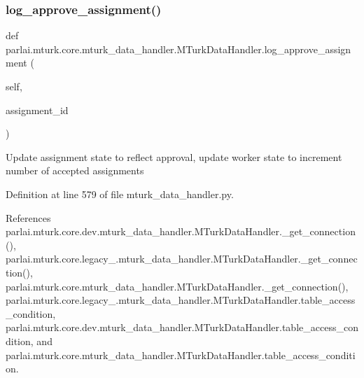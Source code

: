 \subsubsection{\texorpdfstring{log\+\_\+approve\+\_\+assignment()}{log\_approve\_assignment()}}
{\footnotesize\ttfamily def parlai.\+mturk.\+core.\+mturk\+\_\+data\+\_\+handler.\+M\+Turk\+Data\+Handler.\+log\+\_\+approve\+\_\+assignment (\begin{DoxyParamCaption}\item[{}]{self,  }\item[{}]{assignment\+\_\+id }\end{DoxyParamCaption})}

\begin{DoxyVerb}Update assignment state to reflect approval, update worker state to
increment number of accepted assignments
\end{DoxyVerb}
 

Definition at line 579 of file mturk\+\_\+data\+\_\+handler.\+py.



References parlai.\+mturk.\+core.\+dev.\+mturk\+\_\+data\+\_\+handler.\+M\+Turk\+Data\+Handler.\+\_\+get\+\_\+connection(), parlai.\+mturk.\+core.\+legacy\+\_.\+mturk\+\_\+data\+\_\+handler.\+M\+Turk\+Data\+Handler.\+\_\+get\+\_\+connection(), parlai.\+mturk.\+core.\+mturk\+\_\+data\+\_\+handler.\+M\+Turk\+Data\+Handler.\+\_\+get\+\_\+connection(), parlai.\+mturk.\+core.\+legacy\+\_.\+mturk\+\_\+data\+\_\+handler.\+M\+Turk\+Data\+Handler.\+table\+\_\+access\+\_\+condition, parlai.\+mturk.\+core.\+dev.\+mturk\+\_\+data\+\_\+handler.\+M\+Turk\+Data\+Handler.\+table\+\_\+access\+\_\+condition, and parlai.\+mturk.\+core.\+mturk\+\_\+data\+\_\+handler.\+M\+Turk\+Data\+Handler.\+table\+\_\+access\+\_\+condition.

